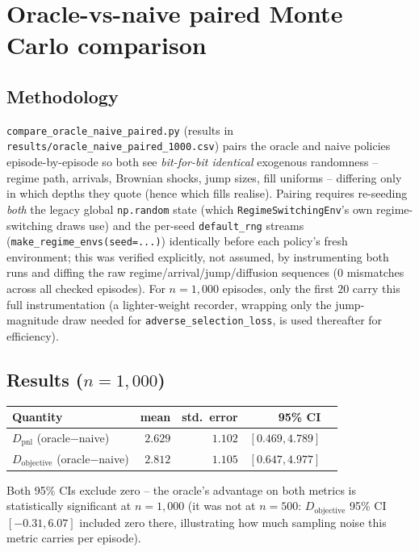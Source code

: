 \documentclass[11pt]{article}
\begin{document}
\section{Oracle-vs-naive paired Monte Carlo comparison}
\label{sec:oraclenaive}

\subsection{Methodology}
\texttt{compare\_oracle\_naive\_paired.py} (results in \texttt{results/oracle\_naive\_paired\_1000.csv}) pairs the oracle and naive policies episode-by-episode so both see \emph{bit-for-bit identical} exogenous randomness -- regime path, arrivals, Brownian shocks, jump sizes, fill uniforms -- differing only in which depths they quote (hence which fills realise). Pairing requires re-seeding \emph{both} the legacy global \texttt{np.random} state (which \texttt{RegimeSwitchingEnv}'s own regime-switching draws use) and the per-seed \texttt{default\_rng} streams (\texttt{make\_regime\_envs(seed=...)}) identically before each policy's fresh environment; this was verified explicitly, not assumed, by instrumenting both runs and diffing the raw regime/arrival/jump/diffusion sequences (0 mismatches across all checked episodes). For $n=1{,}000$ episodes, only the first $20$ carry this full instrumentation (a lighter-weight recorder, wrapping only the jump-magnitude draw needed for \texttt{adverse\_selection\_loss}, is used thereafter for efficiency).

\subsection{Results ($n=1{,}000$)}
\begin{center}
\begin{tabular}{@{}lrrrr@{}}
\toprule
Quantity & mean & std.\ error & 95\% CI \\
\midrule
$D_{\text{pnl}}$ (oracle$-$naive) & $2.629$ & $1.102$ & $[0.469, 4.789]$ \\
$D_{\text{objective}}$ (oracle$-$naive) & $2.812$ & $1.105$ & $[0.647, 4.977]$ \\
\bottomrule
\end{tabular}
\end{center}
Both 95\% CIs exclude zero -- the oracle's advantage on both metrics is statistically significant at $n=1{,}000$ (it was not at $n=500$: $D_{\text{objective}}$ 95\% CI $[-0.31, 6.07]$ included zero there, illustrating how much sampling noise this metric carries per episode).
\end{document}
